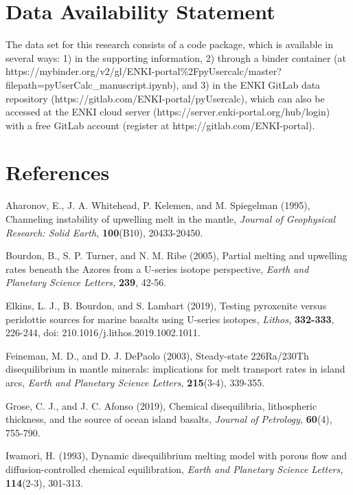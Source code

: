 \documentclass[11pt]{article}
\begin{document}
    \hypertarget{data-availability-statement}{%
\section*{Data Availability Statement}\label{data-availability-statement}}

The data set for this research consists of a code package, which is available in several ways: 1) in the supporting information, 2) through a binder container (at https://mybinder.org/v2/gl/ENKI-portal\%2FpyUsercalc/master?filepath=pyUserCalc\_manuscript.ipynb), and 3) in the ENKI GitLab data repository (https://gitlab.com/ENKI-portal/pyUsercalc), which can also be accessed at the ENKI cloud server (https://server.enki-portal.org/hub/login) with a free GitLab account (register at https://gitlab.com/ENKI-portal).

    \hypertarget{references}{%
\section*{References}\label{references}}

    Aharonov, E., J. A. Whitehead, P. Kelemen, and M. Spiegelman (1995),
Channeling instability of upwelling melt in the mantle, \emph{Journal of
Geophysical Research: Solid Earth,} \textbf{100}(B10), 20433-20450.

Bourdon, B., S. P. Turner, and N. M. Ribe (2005), Partial melting and
upwelling rates beneath the Azores from a U-series isotope perspective,
\emph{Earth and Planetary Science Letters,} \textbf{239}, 42-56.

Elkins, L. J., B. Bourdon, and S. Lambart (2019), Testing pyroxenite
versus peridottie sources for marine basalts using U-series isotopes,
\emph{Lithos,} \textbf{332-333}, 226-244, doi:
210.1016/j.lithos.2019.1002.1011.

Feineman, M. D., and D. J. DePaolo (2003), Steady-state 226Ra/230Th
disequilibrium in mantle minerals: implications for melt transport rates
in island arcs, \emph{Earth and Planetary Science Letters,}
\textbf{215}(3-4), 339-355.

Grose, C. J., and J. C. Afonso (2019), Chemical disequilibria,
lithospheric thickness, and the source of ocean island basalts,
\emph{Journal of Petrology,} \textbf{60}(4), 755-790.

Iwamori, H. (1993), Dynamic disequilibrium melting model with porous
flow and diffusion-controlled chemical equilibration, \emph{Earth and
Planetary Science Letters,} \textbf{114}(2-3), 301-313.
\end{document}

